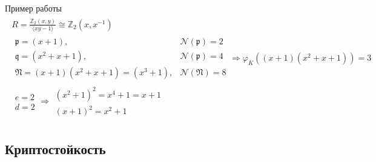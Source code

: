 \documentclass[8pt, xcolor=x11names]{beamer}
\begin{document}
\begin{frame}
    \begin{block}{Пример работы}
        \begin{eqnarray*}
            \begin{array}{c}
                R = \frac{\mathbb{Z}_2(x, y)}{\langle xy - 1\rangle} \cong \mathbb{Z}_2(x, x^{-1})\\
                \begin{array}{ll}
                    \mathfrak{p} = (x+1), & \mathcal{N}(\mathfrak{p}) = 2\\
                    \mathfrak{q} = (x^2 + x + 1), & \mathcal{N}(\mathfrak{p}) = 4\\
                    \mathfrak{N} = (x+1)(x^2 + x + 1) = (x^3 + 1), & \mathcal{N}(\mathfrak{N}) = 8
                \end{array}
                \Rightarrow
                \varphi_K((x+1)(x^2 + x + 1)) = 3\\
                \begin{array}{l}
                    e = 2\\
                    d = 2
                \end{array}
                \Rightarrow
                \begin{array}{l}
                    (x^2 + 1)^2 = x^4 + 1 = x + 1\\
                    (x + 1)^2 = x^2 + 1
                \end{array}
            \end{array}
        \end{eqnarray*}
    \end{block}
\end{frame}

\subsection{Криптостойкость}
\end{document}

